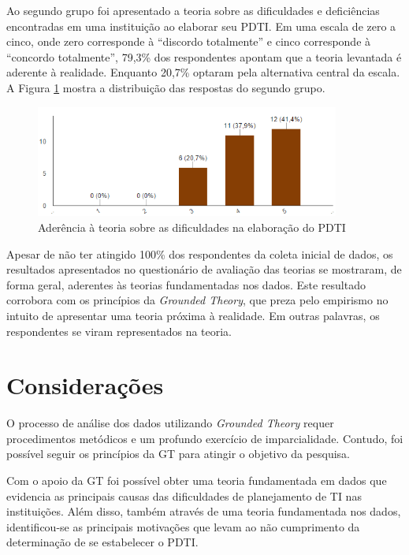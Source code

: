 Ao segundo grupo foi apresentado a teoria sobre as dificuldades e deficiências encontradas em uma instituição ao elaborar seu PDTI. Em uma escala de zero a cinco, onde zero corresponde à ``discordo totalmente'' e cinco corresponde à ``concordo totalmente'', 79,3\% dos respondentes apontam que a teoria levantada é aderente à realidade. Enquanto 20,7\% optaram pela alternativa central da escala. A Figura \ref{figura:grafico_ava_grupoComPDTI} mostra a distribuição das respostas do segundo grupo.

\begin{figure}[h]
\centering %
\includegraphics[width=10cm, frame]{figuras/grafico_ava_grupoComPDTI.PNG}
\caption{Aderência à teoria sobre as dificuldades na elaboração do PDTI}
\label{figura:grafico_ava_grupoComPDTI}
\end{figure}

Apesar de não ter atingido 100\% dos respondentes da coleta inicial de dados, os resultados apresentados no questionário de avaliação das teorias se mostraram, de forma geral, aderentes às teorias fundamentadas nos dados. Este resultado corrobora com os princípios da \textit{Grounded Theory}, que preza pelo empirismo no intuito de apresentar uma teoria próxima à realidade. Em outras palavras, os respondentes se viram representados na teoria.

\section{Considerações}
O processo de análise dos dados utilizando \textit{Grounded Theory} requer procedimentos metódicos e um profundo exercício de imparcialidade. Contudo, foi possível seguir os princípios da GT para atingir o objetivo da pesquisa.

Com o apoio da GT foi possível obter uma teoria fundamentada em dados que evidencia as principais causas das dificuldades de planejamento de TI nas instituições. Além disso, também através de uma teoria fundamentada nos dados, identificou-se as principais motivações que levam ao não cumprimento da determinação de se estabelecer o PDTI.


